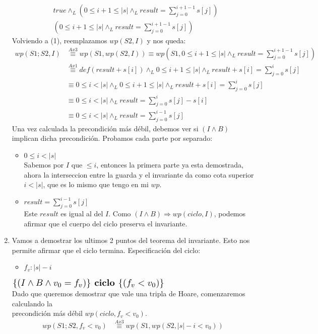 \documentclass{article}
\begin{document}
\begin{enumerate}[label=\alph*)]
\begin{align*}
		&true\wedge_L (0\leq i+1\leq |s| \wedge_L result=\sum_{j=0}^{i+1-1}s[j])\\
		& (0\leq i+1\leq |s| \wedge_L result=\sum_{j=0}^{i+1-1}s[j])
	\end{align*}
	Volviendo a (1), reemplazamos $wp(S2,I)$ y nos queda:
	\begin{align*}
	wp(S1;S2,I)&\stackrel{Ax3}{\equiv}wp(S1,wp(S2,I))\equiv wp(S1,0\leq i+1\leq |s| \wedge_L result=\sum_{j=0}^{i+1-1}s[j])\\
		&\stackrel{Ax1}{\equiv}def(result+s[i])\wedge_L 0\leq i+1\leq |s| \wedge_L result+s[i]=\sum_{j=0}^{i}s[j]\\
		&\equiv 0\leq i<|s|\wedge_L 0\leq i+1\leq |s| \wedge_L result+s[i]=\sum_{j=0}^{i}s[j]\\
		&\equiv 0\leq i<|s| \wedge_L result=\sum_{j=0}^{i}s[j]-s[i]\\
		&\equiv 0\leq i<|s| \wedge_L result=\sum_{j=0}^{i-1}s[j]
	\end{align*}
	Una vez calculada la precondición más débil, debemos ver si $(I\wedge B)$ implican dicha precondición. Probamos cada
	parte por separado:
	\begin{itemize}
		\item $ 0\leq i< |s|$\smallskip \\
		Sabemos por $I$ que $\leq i$, entonces la primera parte ya esta demostrada, ahora la interseccion entre la guarda
		y el invariante da como cota superior $i<|s|$, que es lo mismo que tengo en mi $wp$.
		\item $result=\sum_{j=0}^{i-1}s[j]$\smallskip \\
		Este $result$ es igual al del $I$.
		Como $(I\wedge B) \Rightarrow wp(ciclo,I)$, podemos afirmar que el cuerpo del ciclo preserva el invariante.
	\end{itemize}
	\item 
	Vamos  a demostrar los ultimos 2 puntos del teorema del invariante. Esto nos permite afirmar que el ciclo termina. Especificación del ciclo:
	\begin{itemize}
	\item $f_v:|s|-i$
	\end{itemize}
	$\scalebox{1.3}{$\{(I\wedge B\wedge v_0=f_v)\}\textbf{ ciclo }\{(f_v<v_0)\}$}$\medskip \\
	Dado que queremos demostrar que vale una tripla de Hoare, comenzaremos calculando la\\ precondición más débil $wp(ciclo,f_v<v_0)$.
	\begin{align*}
		wp(S1;S2,f_v<v_0)&\stackrel{Ax3}{\equiv}wp(S1,wp(S2,|s|-i<v_0))\\

\end{align*}
\end{enumerate}
\end{document}
